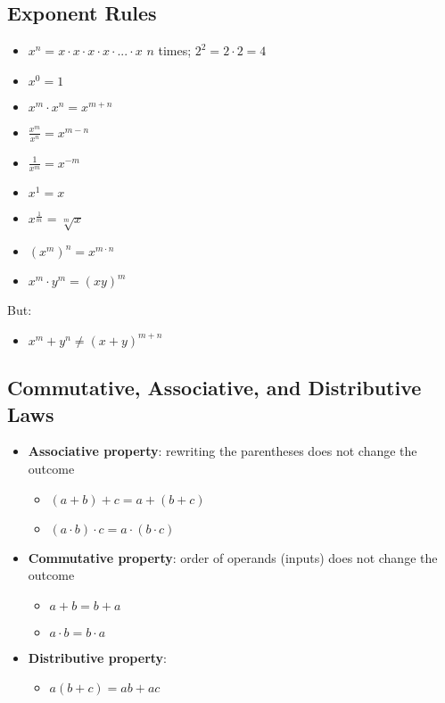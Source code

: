 \subsection{Exponent Rules}

\begin{itemize}
    \itemsep-0.25em 
    \item $x^n = x \cdot x \cdot x \cdot x \cdot ... \cdot x$ $n$ times; $2^2 = 2 \cdot 2 = 4$
    \item $x^0 = 1$
    \item $x^m \cdot x^n = x^{m+n}$
    \item $\frac{x^m}{x^n} = x^{m-n}$
    \item $\frac{1}{x^m} = x^{-m}$
    \item $x^1 = x$
    \item $x^{\frac{1}{m}} = \sqrt[m]{x}$
    \item $(x^m)^n = x^{m \cdot n}$
    \item $x^m \cdot y^m = (xy)^m$
\end{itemize}

\noindent But:

\begin{itemize}
    \item $x^m + y^n \neq (x + y)^{m + n}$
\end{itemize}

\subsection{Commutative, Associative, and Distributive Laws}

\begin{itemize}
    \itemsep-0.5em 
    \item \textbf{Associative property}: rewriting the parentheses does not change the outcome
    \begin{itemize}
        \item $(a + b) + c = a + (b + c)$
        \item $(a \cdot b) \cdot c = a \cdot (b \cdot c)$
    \end{itemize}
    \item \textbf{Commutative property}: order of operands (inputs) does not change the outcome
    \begin{itemize}
        \item $a + b = b + a$
        \item $a \cdot b = b \cdot a$
    \end{itemize}
    \item \textbf{Distributive property}:
    \begin{itemize}
        \item $a(b + c) = ab + ac$
    \end{itemize}
\end{itemize}

